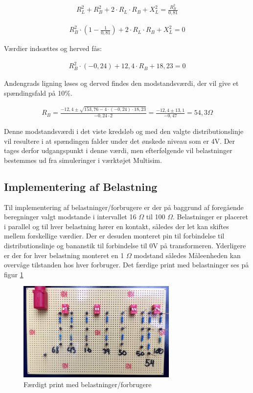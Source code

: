 \begin{align}
R_L^2+R_B^2+2\cdot R_L\cdot R_B+X_L^2=\frac{R_B^2}{0,81}
\end{align}

\begin{align}
R_B^2\cdot (1-\frac{1}{0,81})+2\cdot R_L\cdot R_B+X_L^2=0
\end{align}

Værdier indsættes og herved fås:

\begin{align}
R_B^2\cdot (-0,24) +12,4\cdot R_B+18,23=0
\end{align}

Andengrads ligning løses og derved findes den modstandsværdi, der vil give et spændingsfald på 10\%.

\begin{align}
R_B=\frac{-12,4\pm\sqrt{153,76-4\cdot(-0,24)\cdot18,23}}{-0,24\cdot 2}=\frac{-12,4\pm 13,1}{-0,47}=54,3 \Omega
\end{align}

Denne modstandsværdi i det viste kredsløb og med den valgte distributionslinje vil resultere i at spændingen falder under det ønskede niveau som er 4V. Der tages derfor udgangspunkt i denne værdi, men efterfølgende vil belastninger bestemmes ud fra simuleringer i værktøjet Multisim. 

\subsection{Implementering af Belastning}
Til implementering af belastninger/forbrugere er der på baggrund af foregående beregninger valgt modstande i intervallet 16 $\Omega$ til 100 $\Omega$. Belastninger er placeret i parallel og til hver belastning hører en kontakt, således der let kan skiftes mellem forskellige værdier. Der er desuden monteret pin til forbindelse til distributionslinje og bananstik til forbindelse til 0V på transformeren. Yderligere er der for hver belastning monteret en 1 $\Omega$ modstand således Måleenheden kan overvåge tilstanden hos hver forbruger. Det færdige print med belastninger ses på figur \ref{fig:Belastning1}

\begin{figure}[H] 
	\centering
	\includegraphics[width=0.7\textwidth]{Figure/Belastningskreds}
	\caption{Færdigt print med belastninger/forbrugere}
	\label{fig:Belastning1}
\end{figure}


